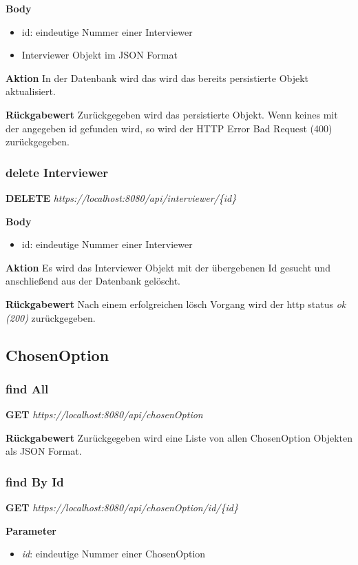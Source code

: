 \textbf{Body}
\begin{itemize}
    \item id: eindeutige Nummer einer Interviewer
    \item Interviewer Objekt im JSON Format
\end{itemize}

\textbf{Aktion}
In der Datenbank wird das wird das bereits persistierte Objekt aktualisiert.

\textbf{Rückgabewert}
Zurückgegeben wird das persistierte Objekt. Wenn keines mit der angegeben id gefunden wird, so wird der HTTP Error Bad Request
(400) zurückgegeben.

\subsubsection{delete Interviewer}
\textbf{DELETE} \emph{https://localhost:8080/api/interviewer/\{id\}}

\textbf{Body}
\begin{itemize}
    \item id: eindeutige Nummer einer Interviewer
\end{itemize}

\textbf{Aktion}
Es wird das Interviewer Objekt mit der übergebenen Id gesucht und anschließend
aus der Datenbank gelöscht.

\textbf{Rückgabewert}
Nach einem erfolgreichen lösch Vorgang wird der http status \emph{ok (200)} zurückgegeben.

\subsection{ChosenOption}
\subsubsection{find All}
\textbf{GET} \emph{https://localhost:8080/api/chosenOption}

\textbf{Rückgabewert}
Zurückgegeben wird eine Liste von allen ChosenOption Objekten als JSON
Format.

\subsubsection{find By Id}
\textbf{GET} \emph{https://localhost:8080/api/chosenOption/id/\{id\}}

\textbf{Parameter}
\begin{itemize}
    \item \emph{id}: eindeutige Nummer einer ChosenOption
\end{itemize}


